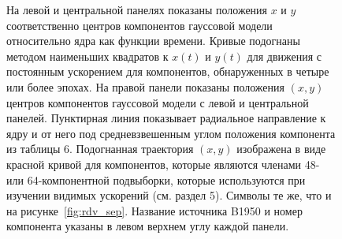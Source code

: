 \begin{figure}[]
 \caption{На левой и центральной панелях показаны положения $x$ и $y$ соответственно центров
компонентов гауссовой модели относительно ядра как функции времени. Кривые подогнаны методом
наименьших квадратов к $x(t)$ и $y(t)$ для движения с постоянным ускорением для компонентов,
обнаруженных в четыре или более эпохах. На правой панели показаны положения $(x, y)$ центров
компонентов гауссовой модели с левой и центральной панелей. Пунктирная линия показывает радиальное
направление к ядру и от него под средневзвешенным углом положения компонента из таблицы 6.
Подогнанная траектория $(x, y)$ изображена в виде красной кривой для компонентов, которые
являются членами 48- или 64-компонентной подвыборки, которые используются при изучении видимых
ускорений (см. раздел 5). Символы те же, что и на рисунке~\ref{fig:rdv_sep}. Название источника
B1950 и номер компонента указаны в левом верхнем углу каждой панели.}
 \label{fig:rdv_xy}
\end{figure}

